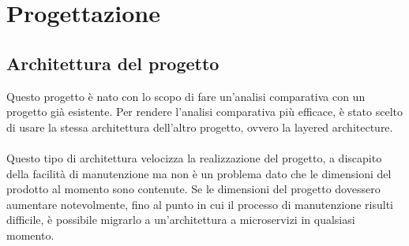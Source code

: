 
\chapter{Progettazione}
\label{cap:progettazione}


\section{Architettura del progetto}
Questo progetto è nato con lo scopo di fare un'analisi
comparativa con un progetto già esistente. Per rendere 
l'analisi comparativa più efficace, è stato scelto di usare la stessa architettura dell'altro progetto, 
ovvero la layered architecture.
\\\\
Questo tipo di architettura velocizza la realizzazione del progetto, a discapito della facilità di
manutenzione ma non è un problema dato che le dimensioni del prodotto al momento sono contenute. Se
le dimensioni del progetto dovessero aumentare notevolmente, fino al punto in cui il processo di manutenzione risulti 
difficile, è possibile
migrarlo a un'architettura a microservizi in qualsiasi momento.


